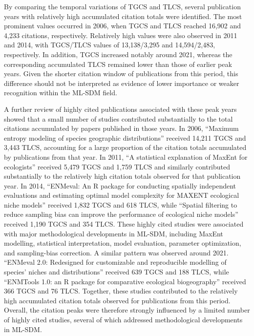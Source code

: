 \documentclass[authoryear,preprint,review,12pt]{elsarticle}
\begin{document}
By comparing the temporal variations of TGCS and TLCS, several publication years with relatively high accumulated citation totals were identified. The most prominent values occurred in 2006, when TGCS and TLCS reached 16,902 and 4,233 citations, respectively. Relatively high values were also observed in 2011 and 2014, with TGCS/TLCS values of 13,138/3,295 and 14,594/2,483, respectively. In addition, TGCS increased notably around 2021, whereas the corresponding accumulated TLCS remained lower than those of earlier peak years. Given the shorter citation window of publications from this period, this difference should not be interpreted as evidence of lower importance or weaker recognition within the ML-SDM field.

A further review of highly cited publications associated with these peak years showed that a small number of studies contributed substantially to the total citations accumulated by papers published in those years. In 2006, “Maximum entropy modeling of species geographic distributions” \citep{phillips2006maximum} received 14,211 TGCS and 3,443 TLCS, accounting for a large proportion of the citation totals accumulated by publications from that year. In 2011, “A statistical explanation of MaxEnt for ecologists” \citep{elith2011statistical} received 5,479 TGCS and 1,759 TLCS and similarly contributed substantially to the relatively high citation totals observed for that publication year. In 2014, “ENMeval: An R package for conducting spatially independent evaluations and estimating optimal model complexity for MAXENT ecological niche models” \citep{muscarella2014enm} received 1,832 TGCS and 618 TLCS, while “Spatial filtering to reduce sampling bias can improve the performance of ecological niche models” \citep{boria2014spatial} received 1,190 TGCS and 354 TLCS. These highly cited studies were associated with major methodological developments in ML-SDM, including MaxEnt modelling, statistical interpretation, model evaluation, parameter optimization, and sampling-bias correction. A similar pattern was observed around 2021. “ENMeval 2.0: Redesigned for customizable and reproducible modelling of species’ niches and distributions” \citep{kass2021enmeval} received 639 TGCS and 188 TLCS, while “ENMTools 1.0: an R package for comparative ecological biogeography” \citep{warren2021enmtools} received 366 TGCS and 76 TLCS. Together, these studies contributed to the relatively high accumulated citation totals observed for publications from this period. Overall, the citation peaks were therefore strongly influenced by a limited number of highly cited studies, several of which addressed methodological developments in ML-SDM.
\end{document}
